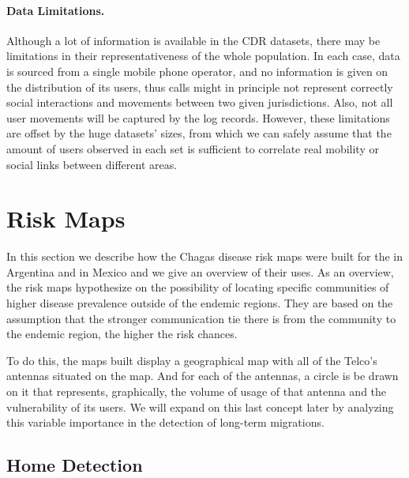 \paragraph{Data Limitations.}
Although a lot of information is available in the CDR datasets, there may be limitations in their representativeness of the whole population. In each case, data is sourced from a single mobile phone operator, and no information is given on the distribution of its users, thus calls might in principle not represent correctly social interactions and movements between two given jurisdictions. Also, not all user movements will be captured by the log records. However, these limitations are offset by the huge datasets' sizes, from which we can safely assume that the amount of users observed in each set is sufficient to correlate real mobility or social links between different areas.






\section{ Risk Maps}\label{section:risk_maps}

In this section we describe how the Chagas disease risk maps were built for the in Argentina and in Mexico and we give an overview of their uses. As an overview, the risk maps hypothesize on the possibility of locating specific communities of higher disease prevalence outside of the endemic regions. They are based on the assumption that the stronger communication tie there is from the community to the endemic region, the higher the risk chances.

To do this, the maps built display a geographical map with all of the Telco's antennas situated on the map. And for each of the antennas, a circle is be drawn on it that represents, graphically, the volume of usage of that antenna and the vulnerability of its users. We will expand on this last concept later by analyzing this variable importance in the detection of long-term migrations.

\subsection{Home Detection}\label{subsection:home_detection}

